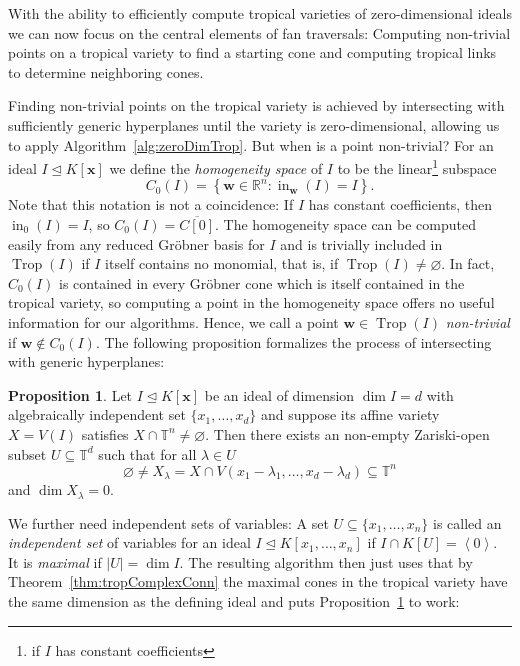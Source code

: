 \documentclass[
  paper=a4,
  titlepage,
  bibliography=totoc,
  pagesize=pdftex
]{scrartcl}
\numberwithin{figure}{section}
\numberwithin{equation}{section}
\numberwithin{table}{section}
\newcommand*\setR{\mathds{R}}
\newcommand*\setT{\mathds{T}}
\newcommand*\ideal[1]{\left\langle #1 \right\rangle}
\let\vec\mathbf
\let\idealof\trianglelefteq
\DeclareMathOperator{\Trop}{Trop}
\DeclareMathOperator{\initial}{in}
\theoremstyle{definition}
\newtheorem{proposition}[definition]{Proposition}
\numberwithin{definition}{section}
\begin{document}
With the ability to efficiently compute tropical varieties of zero-dimensional ideals we
can now focus on the central elements of fan traversals: Computing non-trivial points on a
tropical variety to find a starting cone and computing tropical links to determine
neighboring cones.

Finding non-trivial points on the tropical variety is achieved by intersecting with
sufficiently generic hyperplanes until the variety is zero-dimensional, allowing us to
apply Algorithm~\ref{alg:zeroDimTrop}. But when is a point non-trivial? For an ideal $I
\idealof K[\vec x]$ we define the \emph{homogeneity space} of $I$ to be the
linear\footnote{if $I$ has constant coefficients} subspace
\[
  C_0(I) = \left\{ \vec w \in \setR^n : \initial_{\vec w}(I) = I \right\}.
\]
Note that this notation is not a coincidence: If $I$ has constant coefficients, then
$\initial_0(I) = I$, so $C_0(I) = \overline{C[0]}$. The homogeneity space can be computed
easily from any reduced Gröbner basis for $I$ and is trivially included in $\Trop(I)$ if
$I$ itself contains no monomial, that is, if $\Trop(I) \neq \varnothing$. In fact,
$C_0(I)$ is contained in every Gröbner cone which is itself contained in the tropical
variety, so computing a point in the homogeneity space offers no useful information for
our algorithms. Hence, we call a point $\vec w \in \Trop(I)$ \emph{non-trivial} if $\vec w
\not\in C_0(I)$. The following proposition formalizes the process of intersecting with
generic hyperplanes:

\begin{proposition}
  Let $I \idealof K[\vec x]$ be an ideal of dimension $\dim I = d$ with algebraically
  independent set $\{x_1, \dots, x_d\}$ and suppose its affine variety $X = V(I)$
  satisfies $X \cap \setT^n \neq \varnothing$. Then there exists an non-empty Zariski-open
  subset $U \subseteq \setT^d$ such that for all $\lambda \in U$
  \[
    \varnothing \neq X_\lambda =
    X \cap V(x_1-\lambda_1, \dots, x_d - \lambda_d) \subseteq \setT^n
  \]
  and $\dim X_\lambda = 0$.
  \label{prp:intersHyperp}
\end{proposition}

We further need independent sets of variables: A set $U \subseteq \{ x_1, \dots, x_n \}$
is called an \emph{independent set} of variables for an ideal $I \idealof K[x_1, \dots,
x_n]$ if $I \cap K[U] = \ideal0$. It is \emph{maximal} if $|U| = \dim I$. The resulting
algorithm then just uses that by Theorem~\ref{thm:tropComplexConn} the maximal cones in
the tropical variety have the same dimension as the defining ideal and puts
Proposition~\ref{prp:intersHyperp} to work:
\end{document}
